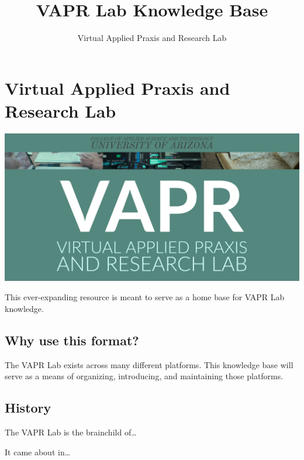 \documentclass[12pt,]{memoir}
\title{VAPR Lab Knowledge Base}
\subtitle{Virtual Applied Praxis and Research Lab}
\author{}
\date{}
\begin{document}
\maketitle

{
\hypersetup{linkcolor=black}
\setcounter{tocdepth}{1}
\tableofcontents
}
\listoftables
\listoffigures
\hypertarget{virtual-applied-praxis-and-research-lab}{%
\chapter*{Virtual Applied Praxis and Research Lab}\label{virtual-applied-praxis-and-research-lab}}

\includegraphics[width=30in]{images/VAPR-brand-banner}

This ever-expanding resource is meant to serve as a home base for VAPR Lab knowledge.

\hypertarget{why-use-this-format}{%
\section*{Why use this format?}\label{why-use-this-format}}

The VAPR Lab exists across many different platforms. This knowledge base will serve as a means of organizing, introducing, and maintaining those platforms.

\hypertarget{history}{%
\section*{History}\label{history}}

The VAPR Lab is the brainchild of\ldots{}

It came about in\ldots{}
\end{document}

